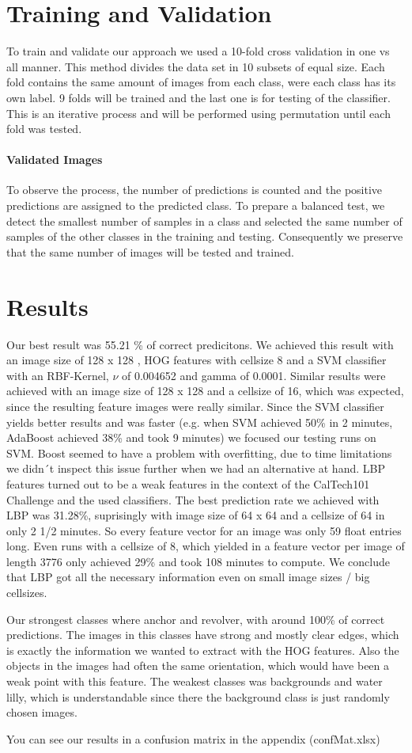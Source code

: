 \documentclass[a4paper,10pt]{article}
\begin{document}
\section{Training and Validation}
To train and validate our approach we used a 10-fold cross validation in one vs all manner. 
This method divides the data set in 10 subsets of equal size. Each fold contains the same amount of images from each class, were each class has its own label. 9 folds will be trained and the last one is for testing of the classifier. This is an iterative process and will be performed using permutation until each fold was tested.
\paragraph{Validated Images}
To observe the process, the number of predictions is counted and the positive predictions are assigned  to the predicted class.
To prepare a balanced test, we detect the smallest number of samples in a class and selected the same number of samples of the other classes in the training and testing. 
Consequently we preserve that the same number of images will be tested and trained.
\section{Results}
Our best result was 55.21 \% of correct predicitons.
We achieved this result with an image size of 128 x 128 , HOG features with cellsize 8 and a SVM classifier with an RBF-Kernel, $\nu$ of 0.004652 and gamma of 0.0001.
Similar results were achieved with an image size of 128 x 128 and a cellsize of 16, which was expected, since the resulting feature images were really similar.
Since the SVM classifier yields better results and was faster (e.g. when SVM achieved 50\% in 2 minutes, AdaBoost achieved 38\% and took 9 minutes) we focused our testing runs on SVM.
Boost seemed to have a problem with overfitting, due to time limitations we didn´t inspect this issue further when we had an alternative at hand.
LBP features turned out to be a weak features in the context of the CalTech101 Challenge and the used classifiers.
The best prediction rate we achieved with LBP was 31.28\%, suprisingly with image size of 64 x 64 and a cellsize of 64 in only 2 1/2 minutes. So every feature vector for an image was only 59 float entries long. Even runs with a cellsize of 8, which yielded in a feature vector per image of length 3776 only achieved 29\% and took 108 minutes to compute.
We conclude that LBP got all the necessary information even on small image sizes / big cellsizes. 

Our strongest classes where anchor and revolver, with around 100\% of correct predictions. 
The images in this classes have strong and mostly clear edges, which is exactly the information we wanted to extract with the HOG features. 
Also the objects in the images had often the same orientation, which would have been a weak point with this feature.
The weakest classes was backgrounds and water lilly, which is understandable since there the background class is just randomly chosen images. 

You can see our results in a confusion matrix in the appendix (confMat.xlsx)



\end{document}
